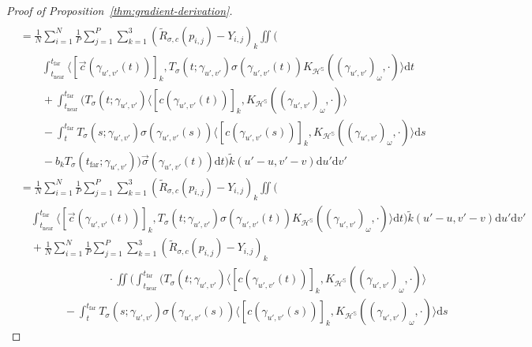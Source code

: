 \documentclass{article}
\newcommand{\dif}{\mathrm{d}}
\newcommand{\render}{{R}}
\newcommand{\near}{\mathrm{near}}
\newcommand{\far}{\mathrm{far}}
\begin{document}
\begin{proof}[Proof of Proposition~\ref{thm:gradient-derivation}]
{\begin{align*}
        \\ &= \frac{1}{N} \sum_{i=1}^N \frac{1}{P} \sum_{j=1}^P \sum_{k=1}^3 ( \widetilde{\render}_{\sigma,c}(p_{i,j}) - Y_{i,j} )_k \iint \Biggl(
            \\ &\qquad \int_{t_\near}^{t_\far}
                \langle [\vec{c}(\gamma_{u',v'}(t))]_k, T_{\sigma}(t;\gamma_{u',v'}) \sigma(\gamma_{u',v'}(t)) K_{\mathcal{H}^\mathbb{S}}((\gamma_{u',v'})_\omega, \cdot) \rangle
            \dif t
            \\ &\qquad
                + \int_{t_\near}^{t_\far} \biggl(
                    T_{\sigma}(t;\gamma_{u',v'})
                    \langle [c(\gamma_{u',v'}(t))]_k, K_{\mathcal{H}^\mathbb{S}}((\gamma_{u',v'})_\omega, \cdot) \rangle
                    \\ &\qquad - \int_{t}^{t_\far} T_{\sigma}(s;\gamma_{u',v'})
                    \sigma(\gamma_{u',v'}(s))
                    \langle [c(\gamma_{u',v'}(s))]_k, K_{\mathcal{H}^\mathbb{S}}((\gamma_{u',v'})_\omega, \cdot) \rangle
                    \dif s
                    \\ &\qquad - b_k T_{\sigma}(t_\far;\gamma_{u',v'})
                \biggr) \vec{\sigma}(\gamma_{u',v'}(t)) \dif t
            \Biggr) \widetilde{k}(u'-u, v'-v) \dif u' \dif v'
        \\ &= \frac{1}{N} \sum_{i=1}^N \frac{1}{P} \sum_{j=1}^P \sum_{k=1}^3 ( \widetilde{\render}_{\sigma,c}(p_{i,j}) - Y_{i,j} )_k \iint \biggl(
            \\ &\quad \int_{t_\near}^{t_\far}
                \langle [\vec{c}(\gamma_{u',v'}(t))]_k, T_{\sigma}(t;\gamma_{u',v'}) \sigma(\gamma_{u',v'}(t)) K_{\mathcal{H}^\mathbb{S}}((\gamma_{u',v'})_\omega, \cdot) \rangle
            \dif t \biggr) \widetilde{k}(u'-u,v'-v) \dif u' \dif v'
        \\ &\quad + \frac{1}{N} \sum_{i=1}^N \frac{1}{P} \sum_{j=1}^P \sum_{k=1}^3 ( \widetilde{\render}_{\sigma,c}(p_{i,j}) - Y_{i,j} )_k
            \\ &\qquad\qquad\qquad\qquad \cdot \iint \biggl(
            \int_{t_\near}^{t_\far} \Biggl(
                T_{\sigma}(t;\gamma_{u',v'})
                \langle [c(\gamma_{u',v'}(t))]_k, K_{\mathcal{H}^\mathbb{S}}((\gamma_{u',v'})_\omega, \cdot) \rangle
                \\ &\qquad\qquad - \int_{t}^{t_\far} T_{\sigma}(s;\gamma_{u',v'})
                \sigma(\gamma_{u',v'}(s))
                \langle [c(\gamma_{u',v'}(s))]_k, K_{\mathcal{H}^\mathbb{S}}((\gamma_{u',v'})_\omega, \cdot) \rangle
                \dif s

\end{align*}}
\end{proof}
\end{document}

